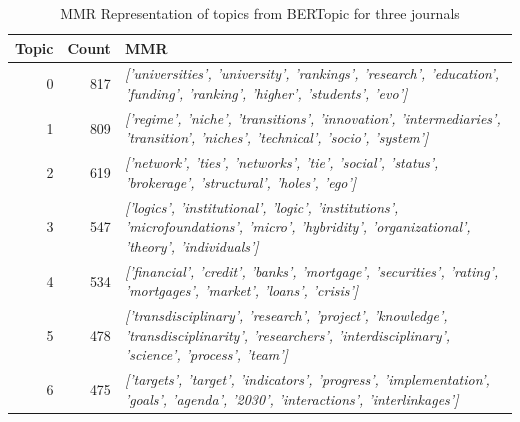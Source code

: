 \documentclass[12pt]{article}
\begin{document}
\begin{landscape}
\begin{table}[]
\small
\centering
\caption{MMR Representation of topics from BERTopic for three journals}
\label{tab:mmr_3j}
\begin{tabular}{rrl}
\hline
\multicolumn{1}{|l|}{\textbf{Topic}} & \multicolumn{1}{l|}{\textbf{Count}} & \multicolumn{1}{l|}{\textbf{MMR}}                                                                                                                                                    \\ \hline
\multicolumn{1}{|r|}{0}              & \multicolumn{1}{r|}{817}            & \multicolumn{1}{l|}{\textit{{[}'universities', 'university', 'rankings', 'research', 'education', 'funding', 'ranking', 'higher', 'students', 'evo'{]}}}                             \\ \hline
\multicolumn{1}{|r|}{1}              & \multicolumn{1}{r|}{809}            & \multicolumn{1}{l|}{\textit{{[}'regime', 'niche', 'transitions', 'innovation', 'intermediaries', 'transition', 'niches', 'technical', 'socio', 'system'{]}}}                         \\ \hline
\multicolumn{1}{|r|}{2}              & \multicolumn{1}{r|}{619}            & \multicolumn{1}{l|}{\textit{{[}'network', 'ties', 'networks', 'tie', 'social', 'status', 'brokerage', 'structural', 'holes', 'ego'{]}}}                                              \\ \hline
\multicolumn{1}{|r|}{3}              & \multicolumn{1}{r|}{547}            & \multicolumn{1}{l|}{\textit{{[}'logics', 'institutional', 'logic', 'institutions', 'microfoundations', 'micro', 'hybridity', 'organizational', 'theory', 'individuals'{]}}}          \\ \hline
\multicolumn{1}{|r|}{4}              & \multicolumn{1}{r|}{534}            & \multicolumn{1}{l|}{\textit{{[}'financial', 'credit', 'banks', 'mortgage', 'securities', 'rating', 'mortgages', 'market', 'loans', 'crisis'{]}}}                                     \\ \hline
\multicolumn{1}{|r|}{5}              & \multicolumn{1}{r|}{478}            & \multicolumn{1}{l|}{\textit{{[}'transdisciplinary', 'research', 'project', 'knowledge', 'transdisciplinarity', 'researchers', 'interdisciplinary', 'science', 'process', 'team'{]}}} \\ \hline
\multicolumn{1}{|r|}{6}              & \multicolumn{1}{r|}{475}            & \multicolumn{1}{l|}{\textit{{[}'targets', 'target', 'indicators', 'progress', 'implementation', 'goals', 'agenda', '2030', 'interactions', 'interlinkages'{]}}}                      \\ \hline

\end{tabular}
\end{table}
\end{landscape}
\end{document}
